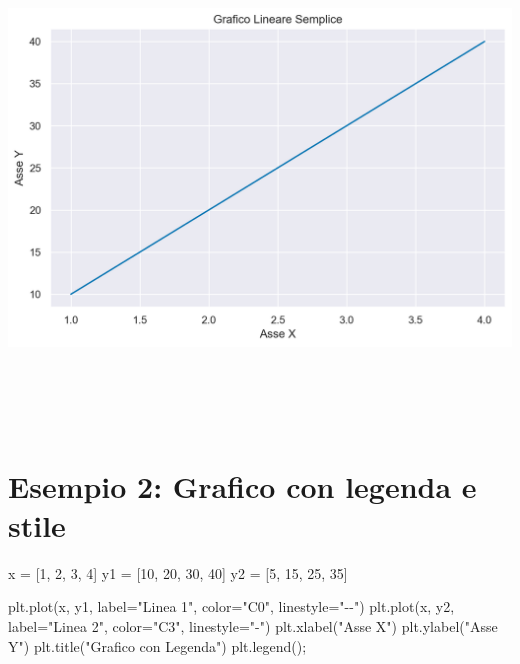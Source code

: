 \documentclass[
  letterpaper,
  krantz2]{{[}./krantz{]}}
\newenvironment{Shaded}{\begin{snugshade}}{\end{snugshade}}
\newcommand{\DecValTok}[1]{\textcolor[rgb]{0.68,0.00,0.00}{#1}}
\newcommand{\NormalTok}[1]{\textcolor[rgb]{0.00,0.23,0.31}{#1}}
\newcommand{\OperatorTok}[1]{\textcolor[rgb]{0.37,0.37,0.37}{#1}}
\newcommand{\StringTok}[1]{\textcolor[rgb]{0.13,0.47,0.30}{#1}}
\begin{document}
\includegraphics[width=7.61458in,height=5.11458in]{chapters/python/07_matplotlib_files/figure-pdf/cell-4-output-1.png}

\section{Esempio 2: Grafico con legenda e
stile}\label{esempio-2-grafico-con-legenda-e-stile}

\begin{Shaded}
\begin{Highlighting}[]
\NormalTok{x }\OperatorTok{=}\NormalTok{ [}\DecValTok{1}\NormalTok{, }\DecValTok{2}\NormalTok{, }\DecValTok{3}\NormalTok{, }\DecValTok{4}\NormalTok{]}
\NormalTok{y1 }\OperatorTok{=}\NormalTok{ [}\DecValTok{10}\NormalTok{, }\DecValTok{20}\NormalTok{, }\DecValTok{30}\NormalTok{, }\DecValTok{40}\NormalTok{]}
\NormalTok{y2 }\OperatorTok{=}\NormalTok{ [}\DecValTok{5}\NormalTok{, }\DecValTok{15}\NormalTok{, }\DecValTok{25}\NormalTok{, }\DecValTok{35}\NormalTok{]}

\NormalTok{plt.plot(x, y1, label}\OperatorTok{=}\StringTok{"Linea 1"}\NormalTok{, color}\OperatorTok{=}\StringTok{"C0"}\NormalTok{, linestyle}\OperatorTok{=}\StringTok{"{-}{-}"}\NormalTok{)}
\NormalTok{plt.plot(x, y2, label}\OperatorTok{=}\StringTok{"Linea 2"}\NormalTok{, color}\OperatorTok{=}\StringTok{"C3"}\NormalTok{, linestyle}\OperatorTok{=}\StringTok{"{-}"}\NormalTok{)}
\NormalTok{plt.xlabel(}\StringTok{"Asse X"}\NormalTok{)}
\NormalTok{plt.ylabel(}\StringTok{"Asse Y"}\NormalTok{)}
\NormalTok{plt.title(}\StringTok{"Grafico con Legenda"}\NormalTok{)}
\NormalTok{plt.legend()}\OperatorTok{;}
\end{Highlighting}
\end{Shaded}
\end{document}
